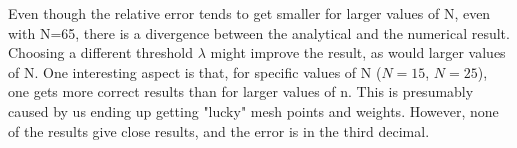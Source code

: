 \documentclass[10pt,a4paper]{article}
\begin{document}
\begin{comment}
\begin{table}[H]
\caption[Cartesian Quadrature using Legendre polynomials]{Achieved results, relative error, time-usage in seconds (averaged over 5 simulations, but for n=55 and n=65)for both the nonparallel and the parallel program (without optimization flags) as well as standard error for integration using Legendre polynomials. }
\begin{tabular}{|l|l|l|l|l|}
\hline
N          & Result   & Relative Error & \pbox{10cm}{time {[}s{]}\\ parallelized}  &  \pbox{10cm}{time {[}s{]}\\ nonparallelized} \\ \hline
10 & 0.129834 & 0.326466       & 0.021025232                             & 0.0388234 \\ \hline
15 & 0.199475 & 0.0348043      & 0.1436784                               & 0.4376558 \\ \hline
20 & 0.177065 & 0.0814488      & 0.7488488                               & 2.70073   \\ \hline
25 & 0.189110  & 0.018967       & 3.107388                                & -       \\ \hline
30 & 0.185796 & 0.0361583      & 8.855728                                & 29.37128  \\ \hline
40 & 0.18867  & 0.0212464      & 49.99648                                & -       \\ \hline
45 & 0.190128 & 0.0136823      & 95.06266                                & -       \\ \hline
55 & 0.190669 & 0.0108763      & 303.598                                 & -       \\ \hline
65 & 0.191035 & 0.00897612     & 823.381                                 & -       \\ \hline
\end{tabular}
\end{table}

\end{comment}

Even though the relative error tends to get smaller for larger values of N, even with N=65, there is a divergence between the analytical and the numerical result. Choosing a different threshold $\lambda$ might improve the result, as would larger values of N. One interesting aspect is that, for specific values of N ($N=15$, $N=25$), one gets more correct results than for larger values of n. This is presumably caused by us ending up getting "lucky" mesh points and weights. However, none of the results give close results, and the error is in the third decimal.
\end{document}
